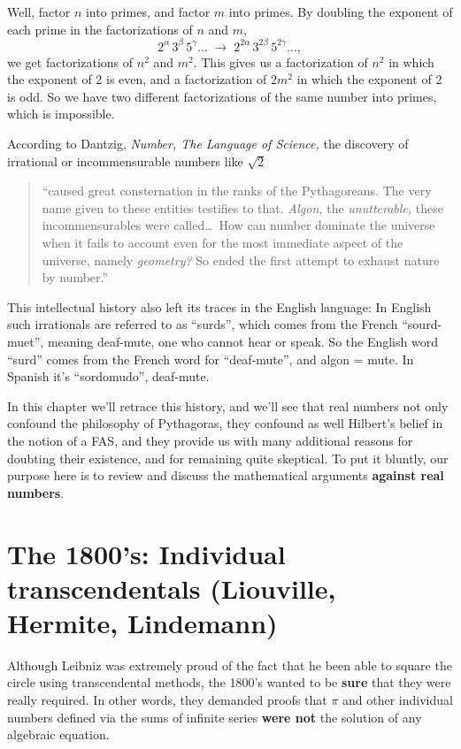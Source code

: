 \documentclass[12pt]{book}
\begin{document}
Well, factor $n$ into primes, and factor $m$ into primes. 
By doubling the exponent of each prime in the 
factorizations of $n$ and $m$,
\[
 2^{\alpha} \, 3^{\beta}\,  5^{\gamma} \ldots
 \; \longrightarrow \;
 2^{2\alpha} \, 3^{2\beta} \, 5^{2\gamma} \ldots,
\] 
we get factorizations of
$n^2$ and $m^2$. 
This gives us a factorization of
$n^2$ in which
the exponent of 2 is even, and 
a factorization of
$2 m^2$ 
in which the exponent of 2 is odd.
So we have two different factorizations of the same number into primes, which is impossible.
 
According to Dantzig, \emph{Number, The Language of Science,}
the  discovery of irrational or incommensurable numbers like $\sqrt{2}$ 
\begin{quote}
``caused great
consternation in the ranks of the Pythagoreans. The very name given to these entities
testifies to that. \emph{Algon,} the \emph{unutterable,} these incommensurables were called\ldots\
How can number dominate the universe when it fails to account even for the most
immediate aspect of the universe, namely \emph{geometry?}
So ended the first attempt to exhaust nature by number.''
\end{quote}
This 
intellectual history also left its traces in the English language:
In English such irrationals are referred to as ``surds'', which comes from
the French ``sourd-muet'', meaning deaf-mute, one who cannot hear or speak. 
So the English word ``surd'' comes from the French word for ``deaf-mute'', and algon = mute.
In Spanish it's ``sordomudo'', deaf-mute.
 
In this chapter we'll retrace this history, and we'll see that real numbers
not only confound the philosophy of Pythagoras, they confound as well Hilbert's belief in the 
notion of a FAS,
and they provide us with many additional reasons for doubting their existence, and for
remaining quite skeptical. To put it bluntly, our purpose here is to review and discuss
the mathematical arguments \textbf{against real numbers}.

\section*{The 1800's: Individual transcendentals (Liouville, Hermite, Lindemann)}

Although Leibniz was extremely proud of the fact that 
he been able to square the circle using transcendental methods,
the 1800's wanted to be \textbf{sure} that they were really required. In other words, they demanded
proofs that $\pi$ and other individual numbers defined via the sums of infinite series
\textbf{were not} the solution of any algebraic equation.
 
\end{document}
